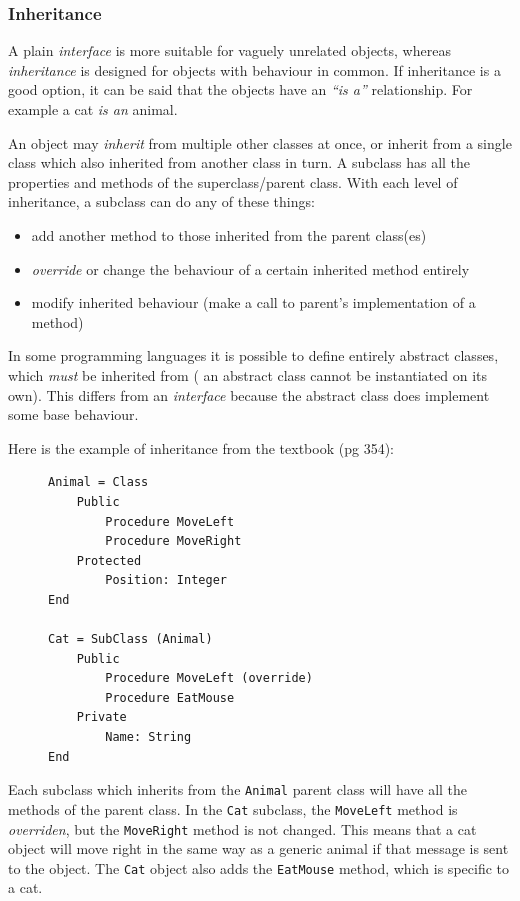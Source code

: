\documentclass[9pt]{article}
\begin{document}
\subsubsection{Inheritance}
\label{sec:org5fe9eb9}

A plain \emph{interface} is more suitable for vaguely unrelated objects, whereas \emph{inheritance} is designed for objects with behaviour in common. If inheritance is a good option, it can be said that the objects have an \emph{``is a''} relationship. For example a cat \emph{is an} animal.

An object may \emph{inherit} from multiple other classes at once, or inherit from a single class which also inherited from another class in turn. A subclass has all the properties and methods of the superclass/parent class. With each level of inheritance, a subclass can do any of these things:

\begin{itemize}
\item add another method to those inherited from the parent class(es)
\item \emph{override} or change the behaviour of a certain inherited method entirely
\item modify inherited behaviour (make a call to parent's implementation of a method)
\end{itemize}

In some programming languages it is possible to define entirely abstract classes, which \emph{must} be inherited from ( an abstract class cannot be instantiated on its own). This differs from an \emph{interface} because the abstract class does implement some base behaviour.

Here is the example of inheritance from the textbook (pg 354):

\begin{figure}[H]
\begin{verbatim}
Animal = Class
    Public
        Procedure MoveLeft
        Procedure MoveRight
    Protected
        Position: Integer
End

Cat = SubClass (Animal)
    Public
        Procedure MoveLeft (override)
        Procedure EatMouse
    Private
        Name: String
End
\end{verbatim}
\end{figure}


Each subclass which inherits from the \texttt{Animal} parent class will have all the methods of the parent class. In the \texttt{Cat} subclass, the \texttt{MoveLeft} method is \emph{overriden}, but the \texttt{MoveRight} method is not changed. This means that a cat object will move right in the same way as a generic animal if that message is sent to the object. The \texttt{Cat} object also adds the \texttt{EatMouse} method, which is specific to a cat.
\end{document}
